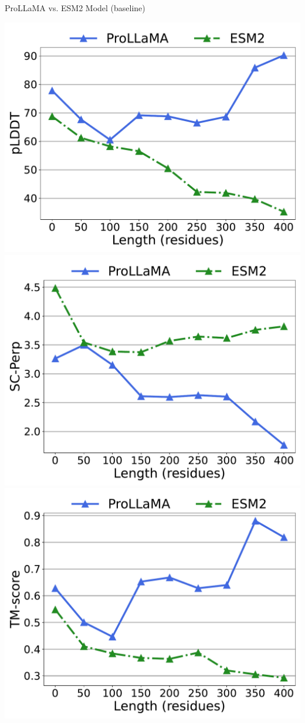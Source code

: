 \documentclass[dvipsnames]{beamer}
\begin{document}
\begin{frame}{ProLLaMA vs. ESM2 Model (baseline)}
	\begin{center}
		\includegraphics[scale=0.23]{images/combined_length_plddt_zhexiantu.pdf}
		\includegraphics[scale=0.23]{images/combined_length_scperp_zhexiantu.pdf}
		\includegraphics[scale=0.23]{images/combined_length_alntmscore_zhexiantu.pdf}

\end{center}
\end{frame}
\end{document}
